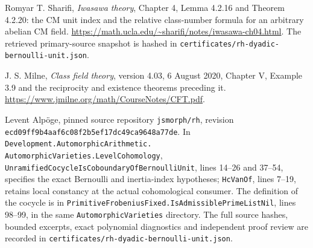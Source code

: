 Romyar T. Sharifi, \emph{Iwasawa theory}, Chapter 4,
Lemma 4.2.16 and Theorem 4.2.20: the CM unit index and the
relative class-number formula for an arbitrary abelian CM field.
\url{https://math.ucla.edu/~sharifi/notes/iwasawa-ch04.html}.
The retrieved primary-source snapshot is hashed in
\texttt{certificates/rh-dyadic-bernoulli-unit.json}.

J. S. Milne, \emph{Class field theory}, version 4.03,
6 August 2020, Chapter V, Example 3.9 and the reciprocity
and existence theorems preceding it.
\url{https://www.jmilne.org/math/CourseNotes/CFT.pdf}.

Levent Alp\"oge, pinned source repository \texttt{jsmorph/rh},
revision \texttt{ecd09ff9b4aaf6c08f2b5ef17dc49ca9648a77de}.
In \texttt{Development.AutomorphicArithmetic.\allowbreak
AutomorphicVarieties.LevelCohomology},
\texttt{UnramifiedCocycleIsCoboundaryOfBernoulliUnit},
lines 14--26 and 37--54, specifies the exact Bernoulli
and inertia-index hypotheses; \texttt{HcVanOf}, lines 7--19,
retains local constancy at the actual cohomological consumer.
The definition of the cocycle is in
\texttt{PrimitiveFrobeniusFixed.\allowbreak IsAdmissiblePrimeListNil},
lines 98--99, in the same \texttt{AutomorphicVarieties} directory.
The full source hashes, bounded excerpts, exact polynomial
diagnostics and independent proof review are recorded in
\texttt{certificates/rh-dyadic-bernoulli-unit.json}.
